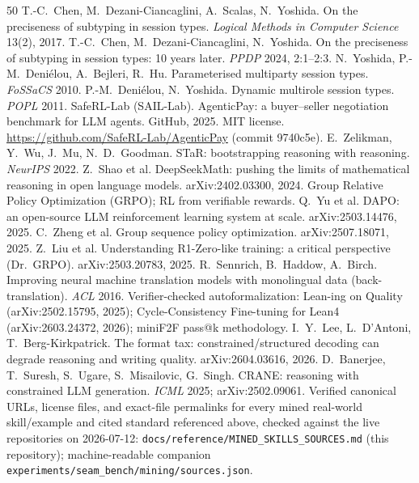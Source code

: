 \documentclass{article}
\begin{document}
\begin{thebibliography}{50}
 T.-C.~Chen, M.~Dezani-Ciancaglini, A.~Scalas, N.~Yoshida. On the preciseness of subtyping in session types. \emph{Logical Methods in Computer Science} 13(2), 2017.
 T.-C.~Chen, M.~Dezani-Ciancaglini, N.~Yoshida. On the preciseness of subtyping in session types: 10 years later. \emph{PPDP} 2024, 2:1--2:3.
 N.~Yoshida, P.-M.~Deni\'elou, A.~Bejleri, R.~Hu. Parameterised multiparty session types. \emph{FoSSaCS} 2010.
 P.-M.~Deni\'elou, N.~Yoshida. Dynamic multirole session types. \emph{POPL} 2011.
 SafeRL-Lab (SAIL-Lab). AgenticPay: a buyer--seller negotiation benchmark for LLM agents. GitHub, 2025. MIT license. \url{https://github.com/SafeRL-Lab/AgenticPay} (commit 9740c5e).
 E.~Zelikman, Y.~Wu, J.~Mu, N.~D.~Goodman. STaR: bootstrapping reasoning with reasoning. \emph{NeurIPS} 2022.
 Z.~Shao et al. DeepSeekMath: pushing the limits of mathematical reasoning in open language models. arXiv:2402.03300, 2024. Group Relative Policy Optimization (GRPO); RL from verifiable rewards.
 Q.~Yu et al. DAPO: an open-source LLM reinforcement learning system at scale. arXiv:2503.14476, 2025.
 C.~Zheng et al. Group sequence policy optimization. arXiv:2507.18071, 2025.
 Z.~Liu et al. Understanding R1-Zero-like training: a critical perspective (Dr.\ GRPO). arXiv:2503.20783, 2025.
 R.~Sennrich, B.~Haddow, A.~Birch. Improving neural machine translation models with monolingual data (back-translation). \emph{ACL} 2016.
 Verifier-checked autoformalization: Lean-ing on Quality (arXiv:2502.15795, 2025); Cycle-Consistency Fine-tuning for Lean4 (arXiv:2603.24372, 2026); miniF2F pass@k methodology.
 I.~Y.~Lee, L.~D'Antoni, T.~Berg-Kirkpatrick. The format tax: constrained/structured decoding can degrade reasoning and writing quality. arXiv:2604.03616, 2026.
 D.~Banerjee, T.~Suresh, S.~Ugare, S.~Misailovic, G.~Singh. CRANE: reasoning with constrained LLM generation. \emph{ICML} 2025; arXiv:2502.09061.
 Verified canonical URLs, license files, and exact-file permalinks for every mined real-world skill/example and cited standard referenced above, checked against the live repositories on 2026-07-12: \texttt{docs/reference/MINED\_SKILLS\_SOURCES.md} (this repository); machine-readable companion \texttt{experiments/seam\_bench/mining/sources.json}.

\end{thebibliography}
\end{document}
